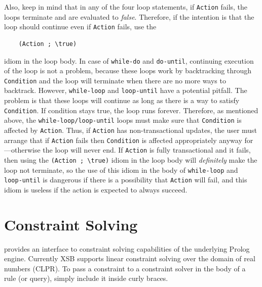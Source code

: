 \documentclass[11pt]{article}
\newcommand{\ERGO}{\mbox{\smaller{\ensuremath{\cal{E}}\smaller{{\sc{RGO}}}}}\xspace}
\newcommand{\FLSYSTEM}{\ERGO}
\newcommand{\bs}{\textbackslash}
\begin{document}
Also, keep in mind that in any of the four loop statements, if {\tt Action}
fails, the loops terminate and are evaluated to \emph{false}. Therefore,
if the intention is that the loop should continue even if {\tt Action}
fails, use the
\begin{verbatim}
    (Action ; \true)  
\end{verbatim}
idiom in the loop body. In case of {\tt while-do} and {\tt do-until},
continuing execution of the loop is not a problem, because these loops work
by backtracking through {\tt Condition} and the loop will terminate when
there are no more ways to backtrack. However, {\tt while-loop}
and {\tt loop-until}  have a potential pitfall. The problem is that
these loops will continue as long as there is a way to satisfy {\tt
  Condition}.  If condition stays true, the loop runs forever.
Therefore, as mentioned above, the \texttt{while-loop/loop-until}
loops must make sure that {\tt Condition}
is affected by {\tt Action}. Thus, if {\tt Action} has non-transactional updates,
the user must arrange that if {\tt Action} fails then {\tt Condition} is
affected appropriately anyway for---otherwise the loop will never end.
If {\tt Action} is fully transactional and it fails, then using the
{\tt (Action ; \bs{}true)} idiom in the loop body will \emph{definitely} make the loop
not terminate, so the use of this idiom in the body of {\tt while-loop} and {\tt
  loop-until} is dangerous if there is a possibility that {\tt Action} will
fail, and this idiom is useless if the action is expected to always succeed.



\section{Constraint Solving}\label{sec-clp}

\FLSYSTEM provides an interface to constraint solving capabilities of the
underlying Prolog engine. Currently XSB supports linear constraint solving
over the domain of real numbers (CLPR).
To pass a constraint to a constraint solver in the body of a \FLSYSTEM
rule (or query), simply include it inside curly braces.
\end{document}
